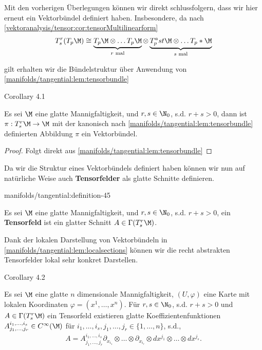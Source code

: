 \documentclass[letterpaper,10pt,german]{jupyterBook}
\begin{document}
\par
Mit den vorherigen Überlegungen können wir direkt schlussfolgern, dass wir hier erneut ein Vektorbündel definiert haben. Insbesondere, da nach \cref{vektoranalysis/tensor:cor:tensorMultilinearform} \begin{align*}
T^r_s(T_p\M) \cong \underbrace{T_p\M\otimes\ldots T_p\M}_{r\text{ mal}}\otimes\underbrace{T_p^ast\M\otimes\ldots T_p\ast\M}_{s\text{ mal}}
\end{align*}
\par
gilt erhalten wir die Bündelstruktur über Anwendung von \cref{manifolds/tangential:lem:tensorbundle} 
\label{manifolds/tangential:corollary-44}
\begin{emphBox}{}{}{Corollary 4.1}



\par
Es sei \(\M\) eine glatte Mannigfaltigkeit, und \(r,s\in\N_0\), s.d. \(r+s>0\), dann ist \(\pi:T^r_s\M\to\M\) mit der kanonisch nach \cref{manifolds/tangential:lem:tensorbundle} definierten Abbildung \(\pi\) ein Vektorbündel.
\end{emphBox}

\begin{proof}
 Folgt direkt aus \cref{manifolds/tangential:lem:tensorbundle} 
\end{proof}

\par
Da wir die Struktur eines Vektorbündels definiert haben können wir nun auf natürliche Weise auch \textbf{Tensorfelder} als glatte Schnitte definieren.
\begin{definition}{}{manifolds/tangential:definition-45}



\par
Es sei \(\M\) eine glatte Mannigfaltigkeit, und \(r,s\in\N_0\), s.d. \(r+s>0\), ein \textbf{Tensorfeld} ist ein glatter Schnitt \(A\in \Gamma(T^r_s\M)\).
\end{definition}

\par
Dank der lokalen Darstellung von Vektorbündeln in \cref{manifolds/tangential:lem:localsections} können wir die recht abstrakten Tensorfelder lokal sehr konkret Darstellen.
\label{manifolds/tangential:cor:tensorfieldchart}
\begin{emphBox}{}{}{Corollary 4.2}



\par
Es sei \(\M\) eine glatte \(n\) dimensionale Mannigfaltigkeit, \((U,\varphi)\) eine Karte mit lokalen Koordinaten \(\varphi=(x^1,\ldots,x^n)\). Für \(r,s\in\N_0\), s.d. \(r+s>0\) und \(A\in \Gamma(T^r_s\M)\) ein Tensorfeld existieren glatte Koeffizientenfunktionen \(A^{i_1,\ldots, i_s}_{j_1,\ldots,j_r}\in C^\infty(\M)\) für \(i_1,\ldots, i_s, j_1,\ldots, j_r\in \{1,\ldots,n\}\), s.d.,
\begin{align*}
A = A^{i_1,\ldots,i_s}_{j_1,\ldots,j_r} \partial_{x_{i_1}}\otimes\ldots\otimes \partial_{x_{i_r}}\otimes dx^{j_1}\otimes\ldots\otimes dx^{j_s}.
\end{align*}\end{emphBox}
\end{document}
